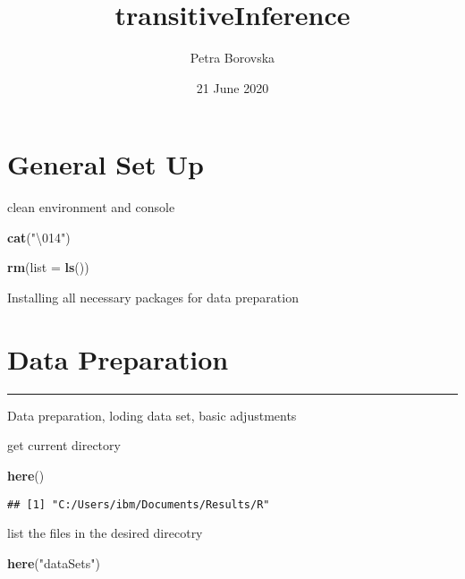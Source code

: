 \documentclass[]{article}
\title{transitiveInference}
\author{Petra Borovska}
\date{21 June 2020}
\newenvironment{Shaded}{\begin{snugshade}}{\end{snugshade}}
\newcommand{\KeywordTok}[1]{\textcolor[rgb]{0.13,0.29,0.53}{\textbf{#1}}}
\newcommand{\DataTypeTok}[1]{\textcolor[rgb]{0.13,0.29,0.53}{#1}}
\newcommand{\CharTok}[1]{\textcolor[rgb]{0.31,0.60,0.02}{#1}}
\newcommand{\StringTok}[1]{\textcolor[rgb]{0.31,0.60,0.02}{#1}}
\newcommand{\NormalTok}[1]{#1}
\begin{document}
\maketitle

\section{General Set Up}\label{general-set-up}

clean environment and console

\begin{Shaded}
\begin{Highlighting}[]
\KeywordTok{cat}\NormalTok{(}\StringTok{"}\CharTok{\textbackslash{}014}\StringTok{"}\NormalTok{)}
\end{Highlighting}
\end{Shaded}



\begin{Shaded}
\begin{Highlighting}[]
\KeywordTok{rm}\NormalTok{(}\DataTypeTok{list =} \KeywordTok{ls}\NormalTok{())}
\end{Highlighting}
\end{Shaded}

Installing all necessary packages for data preparation

\section{Data Preparation}\label{data-preparation}

\begin{center}\rule{0.5\linewidth}{0.5pt}\end{center}

Data preparation, loding data set, basic adjustments

get current directory

\begin{Shaded}
\begin{Highlighting}[]
\KeywordTok{here}\NormalTok{()}
\end{Highlighting}
\end{Shaded}

\begin{verbatim}
## [1] "C:/Users/ibm/Documents/Results/R"
\end{verbatim}

list the files in the desired direcotry

\begin{Shaded}
\begin{Highlighting}[]
\KeywordTok{here}\NormalTok{(}\StringTok{"dataSets"}\NormalTok{)}
\end{Highlighting}
\end{Shaded}
\end{document}
